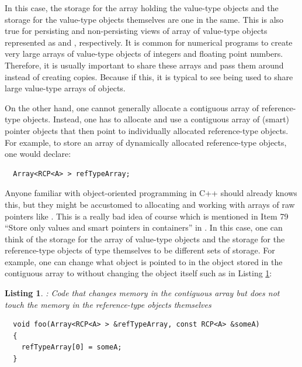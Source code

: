 \documentclass[pdf,ps2pdf,11pt]{SANDreport}
\newtheorem{listing}{Listing}
\begin{document}
In this case, the storage for the array holding the value-type objects
and the storage for the value-type objects themselves are one in the
same.  This is also true for persisting and non-persisting views of
array of value-type objects represented as {}
and {}, respectively.  It is common for
numerical programs to create very large arrays of value-type objects
of integers and floating point numbers.  Therefore, it is usually
important to share these arrays and pass them around instead of
creating copies.  Because if this, it is typical to see
{} being used to share large value-type
arrays of objects.

On the other hand, one cannot generally allocate a contiguous array of
reference-type objects.  Instead, one has to allocate and use a
contiguous array of (smart) pointer objects that then point to
individually allocated reference-type objects.  For example, to store
an array of dynamically allocated reference-type objects, one would
declare:

{\small\begin{verbatim}
  Array<RCP<A> > refTypeArray;
\end{verbatim}}

Anyone familiar with object-oriented programming in C++ should already
knows this, but they might be accustomed to allocating and working
with arrays of raw pointers like {}.  This is a
really bad idea of course which is mentioned in Item 79 ``Store only
values and smart pointers in containers'' in
{}\cite{C++CodingStandards05}.  In this case, one can think of the
storage for the array of {} value-type objects and the
storage for the reference-type objects of type {} themselves to
be different sets of storage.  For example, one can change what
{} object is pointed to in the {} object stored in
the contiguous array to without changing the {} object itself
such as in Listing {}\ref{listing:change-array-not-ref-type-objs}:


{}\begin{listing}: Code that changes memory in the contiguous array
but does not touch the memory in the reference-type objects themselves
\label{listing:change-array-not-ref-type-objs}
{\small\begin{verbatim}
  void foo(Array<RCP<A> > &refTypeArray, const RCP<A> &someA)
  {
    refTypeArray[0] = someA;
  }
\end{verbatim}}
\end{listing}
\end{document}

